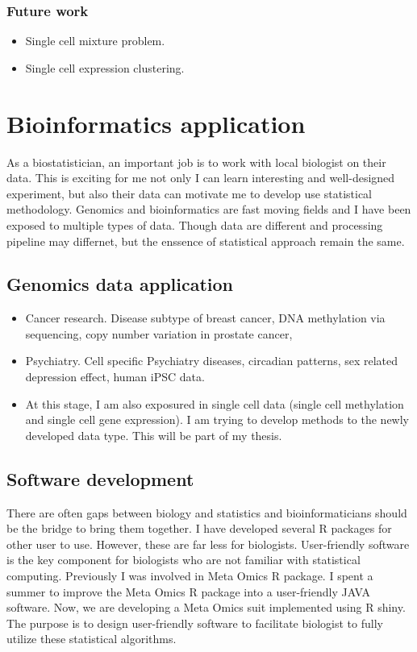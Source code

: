 \documentclass[a4paper, 10pt]{article}
\begin{document}
\subsubsection{Future work}
\begin{itemize}
\item 
Single cell mixture problem.
\item 
Single cell expression clustering.
\end{itemize}


\section{Bioinformatics application}
As a biostatistician,
an important job is to work with local biologist on their data.
This is exciting for me not only I can learn interesting and well-designed experiment,
but also their data can motivate me to develop use statistical methodology.
Genomics and bioinformatics are fast moving fields and I have been exposed to multiple types of data.
Though data are different and processing pipeline may differnet,
but the enssence of statistical approach remain the same.
\subsection{Genomics data application}
\begin{itemize}
\item Cancer research.
Disease subtype of breast cancer, 
DNA methylation via sequencing,
copy number variation in prostate cancer, 
\item Psychiatry.
Cell specific Psychiatry diseases, 
circadian patterns, 
sex related depression effect,
human iPSC data.
\item At this stage, I am also exposured in single cell data (single cell methylation and single cell gene expression).
I am trying to develop methods to the newly developed data type.
This will be part of my thesis.
\end{itemize}

\subsection{Software development}
There are often gaps between biology and statistics and bioinformaticians should be the bridge to bring them together.
I have developed several R packages for other user to use.
However, these are far less for biologists.
User-friendly software is the key component for biologists who are not familiar with statistical computing.
Previously I was involved in Meta Omics R package.
I spent a summer to improve the Meta Omics R package into a user-friendly JAVA software.
Now, we are developing a Meta Omics suit implemented using R shiny. 
The purpose is to design user-friendly software to facilitate biologist to fully utilize these statistical algorithms.
\end{document}

